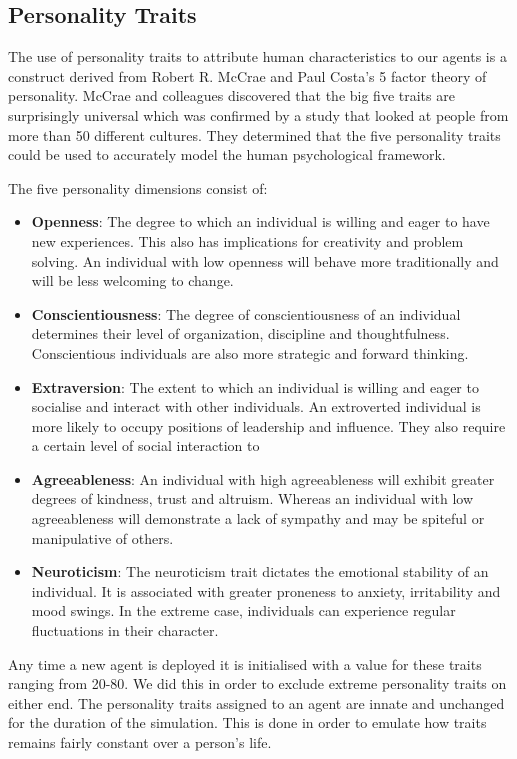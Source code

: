 \subsection{Personality Traits}
\label{subsec: Agent Design}

The use of personality traits to attribute human characteristics to our agents is a construct derived from Robert R. McCrae and Paul Costa's 5 factor theory of personality. McCrae and colleagues discovered that the big five traits are surprisingly universal which was confirmed by a study that looked at people from more than 50 different cultures. They determined that the five personality traits could be used to accurately model the human psychological framework.

The five personality dimensions consist of: 
\begin{itemize}
\item  \textbf{Openness}: The degree to which an individual is willing and eager to have new experiences. This also has implications for creativity and problem solving. An individual with low openness will behave more traditionally and will be less welcoming to change.
\item  \textbf{Conscientiousness}: The degree of conscientiousness of an individual determines their level of organization, discipline and thoughtfulness. Conscientious individuals are also more strategic and forward thinking.
\item  \textbf{Extraversion}: The extent to which an individual is willing and eager to socialise and interact with other individuals. An extroverted individual is more likely to occupy positions of leadership and influence. They also require a certain level of social interaction to 
\item  \textbf{Agreeableness}: An individual with high agreeableness will  exhibit greater degrees of kindness, trust and altruism. Whereas an individual with low agreeableness will demonstrate a lack of sympathy and may be spiteful or manipulative of others. 
\item  \textbf{Neuroticism}: The neuroticism trait dictates the emotional stability of an individual. It is associated with greater proneness to anxiety, irritability and mood swings. In the extreme case, individuals can experience regular fluctuations in their character. 
\end{itemize}

Any time a new agent is deployed it is initialised with a value for these traits ranging from 20-80. We did this in order to exclude extreme personality traits on either end. The personality traits assigned to an agent are innate and unchanged for the duration of the simulation. This is done in order to emulate how traits remains fairly constant over a person's life.



